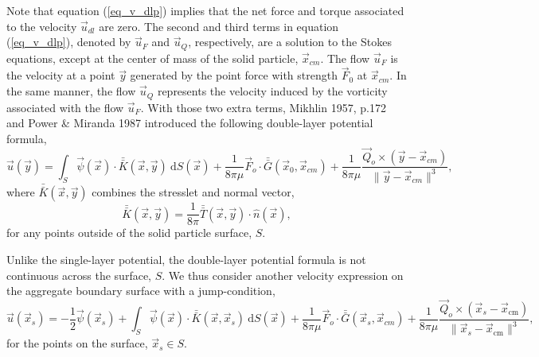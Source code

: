 Note that equation (\ref{eq_v_dlp}) implies that the net force and torque associated to the velocity $\vec{u}_{dl}$ are zero.
The second and third terms in equation (\ref{eq_v_dlp}), denoted by $\vec{u}_F$ and $\vec{u}_Q$, respectively, are a solution to the Stokes equations, except at the center of mass of the solid particle, $\vec{x}_{cm}$.
The flow $\vec{u}_F$ is the velocity at a point $\vec{y}$ generated by the point force with strength $\vec{F}_0$ at $\vec{x}_{cm}$. 
In the same manner, the flow $\vec{u}_Q$ represents the velocity induced by the vorticity associated with the flow $\vec{u}_F$.
With those two extra terms, Mikhlin 1957, p.172 \cite{smithies_integral_1959} and Power \& Miranda 1987 \cite{power_second_1987} introduced the following double-layer potential formula,
\begin{equation}
\vec{u}(\vec{y}) = \int_S
\vec{\psi}(\vec{x}) \cdot  \bar{\bar{K}}(\vec{x},\vec{y})  \ \text{d}S(\vec{x}) + 
\frac{1}{8 \pi \mu }\vec{F}_o \cdot \bar{\bar{G}}(\vec{x}_{0},\vec{x}_{cm})
+\frac{1}{8 \pi \mu } \frac{\vec{Q}_o \times  (\vec{y}   - \vec{x}_{cm} ) }{\| \vec{y}   - \vec{x}_{cm} \|^3 },
 \label{eq_BI_DL}
\end{equation}
where $ \bar{\bar{K}}(\vec{x},\vec{y})$ combines the stresslet and normal vector,
\begin{equation*}
	\bar{\bar{K}}(\vec{x},\vec{y})
	= \frac{1}{8 \pi} \bar{\bar{T}}(\vec{x},\vec{y})  \cdot \hat{n}(\vec{x}),
\end{equation*}
for any points outside of the solid particle surface, $S$.

\par
Unlike the single-layer potential, the double-layer potential formula is not continuous across the surface, $S$.
We thus consider another velocity expression on the aggregate boundary surface with a jump-condition,
\begin{equation}
\vec{u}(\vec{x}_s) = -\frac{1}{2} \vec{\psi}(\vec{x}_s) 
+\int_S  \vec{\psi}(\vec{x})  \cdot \bar{\bar{K}} (\vec{x},\vec{x}_s) \ \text{d}S(\vec{x}) 
+\frac{1}{8 \pi \mu } \vec{F}_o \cdot \bar{\bar{G}}(\vec{x}_{s},\vec{x}_{cm})
+\frac{1}{8 \pi \mu } \frac{\vec{Q}_o \times  (\vec{x}_s   - \vec{x}_{\text{cm}} ) }{\| \vec{x}_s  - \vec{x}_{\text{cm}} \|^3 },
\label{eq_BI_DL_on}
\end{equation}
for the points on the surface, $\vec{x}_s \in S$.

